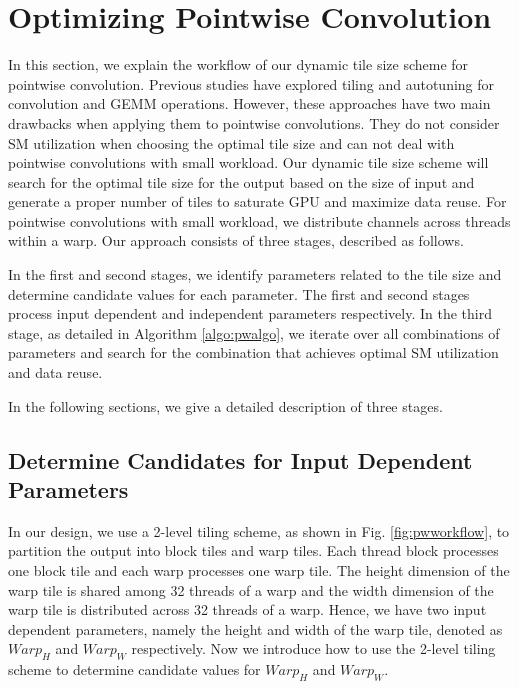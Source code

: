 \section{Optimizing Pointwise Convolution}
\label{sec:pwconv} In this section, we explain the workflow of our dynamic tile size scheme for pointwise convolution.
{\color{red}Previous studies \cite{tanner2018tensile, kelefouras2016high, abdelfattah2019fast, kurzak2015implementation, jiang2020enabling, tillet2017input, lan2019feathercnn,zhang2012autogeneration} have explored tiling and autotuning for convolution and GEMM operations. However, these approaches have two main drawbacks when applying them to pointwise convolutions. They do not consider SM utilization when choosing the optimal tile size and can not deal with pointwise convolutions with small workload. 
Our dynamic tile size scheme will search for the optimal tile size for the output based on the size of input and generate a proper number of tiles to saturate GPU and maximize data reuse.
For pointwise convolutions with small workload, we distribute channels across threads within a warp.}
Our approach consists of three stages, described as follows.

In the first and second stages, we identify parameters related to the tile size and determine candidate values for each parameter. The first and second stages process input dependent and independent parameters respectively. 
In the third stage, as detailed in Algorithm \ref{algo:pwalgo}, we iterate over all combinations of parameters and search for the combination that achieves optimal SM utilization and data reuse.   


In the following sections, we give a detailed description of three stages. 
\subsection{Determine Candidates for Input Dependent Parameters\label{sec:pwinputdependent}}

In our design, we use a 2-level tiling scheme, as shown in Fig. \ref{fig:pwworkflow}, to partition the output into block tiles and warp tiles.
Each thread block processes one block tile and each warp processes one warp tile.
The height dimension of the warp tile is shared among 32 threads of a warp and the width dimension of the warp tile is distributed across 32 threads of a warp.
Hence, we have two input dependent parameters, namely the height and width of the warp tile, denoted as $Warp_H$ and $Warp_W$ respectively.
Now we introduce how to use the 2-level tiling scheme to determine candidate values for $Warp_H$ and $Warp_W$. 
